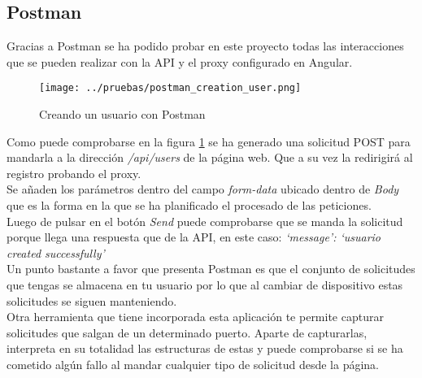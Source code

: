 \subsection{Postman}
Gracias a Postman se ha podido probar en este proyecto todas las interacciones que se pueden realizar con la API y el proxy configurado en Angular.
\begin{figure}[h]
    \centering
    \texttt{[image: ../pruebas/postman\_creation\_user.png]}
    \caption{Creando un usuario con Postman}\label{fig:postman-creation-user}
\end{figure}
Como puede comprobarse en la figura \ref{fig:postman-creation-user} se ha generado una solicitud POST para mandarla a la dirección \textit{/api/users} de la página web. Que a su vez la redirigirá al registro probando el proxy.
\\Se añaden los parámetros dentro del campo \textit{form-data} ubicado dentro de \textit{Body} que es la forma en la que se ha planificado el procesado de las peticiones.
\\Luego de pulsar en el botón \textit{Send} puede comprobarse que se manda la solicitud porque llega una respuesta que de la API, en este caso: \textit{`message': `usuario created successfully'}
\\Un punto bastante a favor que presenta Postman es que el conjunto de solicitudes que tengas se almacena en tu usuario por lo que al cambiar de dispositivo estas solicitudes se siguen manteniendo.
\\Otra herramienta que tiene incorporada esta aplicación te permite capturar solicitudes que salgan de un determinado puerto. Aparte de capturarlas, interpreta en su totalidad las estructuras de estas y puede comprobarse si se ha cometido algún fallo al mandar cualquier tipo de solicitud desde la página.

